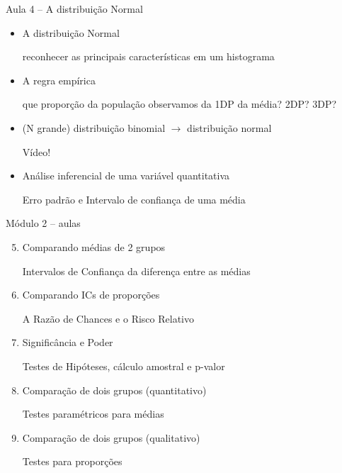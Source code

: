 \documentclass{beamer}
\begin{document}
\begin{frame}{\scriptsize Aula 4 -- A distribuição Normal}
  \begin{itemize}
    \footnotesize
  \item A distribuição Normal

    {\tiny reconhecer as principais características em um histograma}
    \bigskip
  \item A regra empírica

    {\tiny que proporção da população observamos da 1DP da média? 2DP? 3DP?}
    \bigskip
  \item (N grande) distribuição binomial $\rightarrow$ distribuição normal

    {\tiny Vídeo!}
    \bigskip
  \item Análise inferencial de uma variável quantitativa

    {\tiny Erro padrão e Intervalo de confiança de uma média}
  \end{itemize}
\end{frame}

\begin{frame}{\scriptsize Módulo 2 -- aulas}
  \begin{enumerate}
    \setcounter{enumi}{4}
  \item Comparando médias de 2 grupos

    {\tiny Intervalos de Confiança da diferença entre as médias}
    \bigskip
  \item Comparando ICs de proporções

    {\tiny A Razão de Chances e o Risco Relativo}
    \bigskip
  \item Significância e Poder

    {\tiny Testes de Hipóteses, cálculo amostral e p-valor}
    \bigskip
  \item Comparação de dois grupos (quantitativo)

    {\tiny Testes paramétricos para médias}
    \bigskip
  \item Comparação de dois grupos (qualitativo)

    {\tiny Testes para proporções}

  \end{enumerate}
\end{frame}
\end{document}
